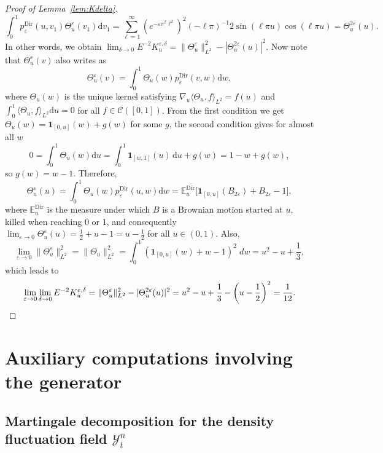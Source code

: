 \documentclass[AHL,Unicode,longabstracts]{cedram}
\DeclareMathOperator{\Dir}{Dir}
\newcommand{\mc}[1]{{\mathcal #1}}
\renewcommand{\mc}[1]{{\mathcal #1}}
\newcommand*{\dd}{\mathrm{d}}
\newcommand*{\du}{\dd u}
\newcommand*{\dv}{\dd v}
\newcommand*{\dw}{\dd w}
\renewcommand{\tfrac}{\frac}
\begin{document}
\begin{proof}[Proof of Lemma~\ref{lem:Kdelta}]
\[
\int_0^1 p^{\Dir}_{\varepsilon} (u, v_1) \Theta^{\varepsilon}_u (v_1) \dv_1 = \sum_{\ell = 1}^{\infty} (e^{- \varepsilon \pi^2 \ell^2})^2 (- \ell\pi)^{- 1} 2 \sin (\ell \pi u) \cos (\ell \pi u) = \Theta^{2\varepsilon}_u (u).
\]
In other words, we obtain $\lim_{\delta \rightarrow 0} E^{- 2} K^{\varepsilon, \delta}_u = \| \Theta^{\varepsilon}_u \|_{L^2}^2 - |\Theta^{2 \varepsilon}_u (u) |^2$. Now note that $\Theta^{\varepsilon}_u (v)$ also writes as
\[
\Theta^\varepsilon_u(v) = \int_0^1 \Theta_u (w) p^{\Dir}_{\varepsilon} (v, w) \dw,
\]
where $\Theta_u (w)$ is the unique kernel satisfying $\nabla_u \langle \Theta_u, f \rangle_{L^2} = f (u)$ and $\int_0^1 \langle
\Theta_u, f \rangle_{L^2} \du = 0$ for all $f \in \mc C([0,1])$. From the first condition we get $\Theta_u (w) =\mathbf{1}_{[0, u]} (w) + g(w)$ for some $g$, the second condition gives for almost all $w$
\[
0 = \int_0^1 \Theta_u (w) \du = \int_0^1 \mathbf{1}_{[w,1]}(u)\,\du + g(w) = 1 - w + g(w),
\]
so $g (w) = w - 1$. Therefore,
\[
\Theta^{\varepsilon}_u (u) = \int_0^1 \Theta_u (w) p^{\Dir}_{\varepsilon} (u, w) \dw =\mathbb{E}_u^{\Dir} \big[\mathbf{1}_{[0, u]} (B_{2 \varepsilon}) + B_{2 \varepsilon} - 1\big],
\]
where $\mathbb{E}^{\Dir}_u$ is the measure under which $B$ is a Brownian motion started at $u$, killed when reaching $0$ or $1$, and consequently $\lim_{\varepsilon \rightarrow 0} \Theta^{\varepsilon}_u (u) = \frac{1}{2} + u - 1 = u - \frac{1}{2}$ for all $u \in (0,1)$. Also,
\begin{equation*}
\lim_{\varepsilon \rightarrow 0} \| \Theta^{\varepsilon}_u \|_{L^2}^2 = \|
\Theta_u \|_{L^2}^2 = \int_0^1 (\mathbf{1}_{[0, u]} (w) + w - 1)^2 \; dw = u^2 - u + \tfrac{1}{3},
\end{equation*}
which leads to
\[
\lim_{\varepsilon \rightarrow 0} \lim_{\delta \rightarrow 0} E^{- 2} K^{\varepsilon, \delta}_u = \| \Theta^{\varepsilon}_u\|_{L^2}^2 - |
\Theta^{2 \varepsilon}_u (u) |^2 = u^2 - u + \tfrac{1}{3} - \left(u -
\tfrac{1}{2} \right)^2 = \tfrac{1}{12}.\qedhere
\]
\end{proof}

\appendix
\section{Auxiliary computations involving the generator}\label{sec:app}

\subsection{Martingale decomposition for the density fluctuation field \texorpdfstring{$\mc Y_t^n$}{Ytn}}\label{app:mart-dens}
\end{document}
